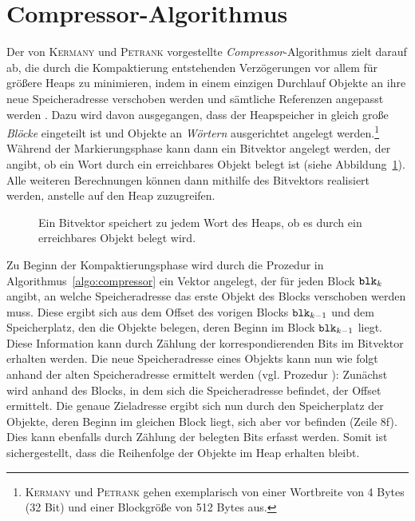 

\section{Compressor-Algorithmus}
\label{sec:compressor}

Der von \textsc{Kermany} und \textsc{Petrank} vorgestellte \textit{Compressor}-Algorithmus zielt darauf ab, die durch die Kompaktierung entstehenden Verzögerungen vor allem für größere Heaps zu minimieren, indem in einem einzigen Durchlauf Objekte an ihre neue Speicheradresse verschoben werden und sämtliche Referenzen angepasst werden \cite{kermany2006}.
Dazu wird davon ausgegangen, dass der Heapspeicher in gleich große \textit{Blöcke} eingeteilt ist und Objekte an \textit{Wörtern} ausgerichtet angelegt werden.\footnote{\textsc{Kermany} und \textsc{Petrank} gehen exemplarisch von einer Wortbreite von 4 Bytes (32 Bit) und einer Blockgröße von 512 Bytes aus.}
Während der Markierungsphase kann dann ein Bitvektor angelegt werden, der angibt, ob ein Wort durch ein erreichbares Objekt belegt ist (siehe Abbildung~\ref{fig:bitvector}).
Alle weiteren Berechnungen können dann mithilfe des Bitvektors realisiert werden, anstelle auf den Heap zuzugreifen.

\begin{figure}[h]
	\centering
	
	\caption[Bitvektor]{Ein Bitvektor speichert zu jedem Wort des Heaps, ob es durch ein erreichbares Objekt belegt wird.}
	\label{fig:bitvector}
\end{figure}

Zu Beginn der Kompaktierungsphase wird durch die Prozedur  in Algorithmus~\ref{algo:compressor} ein Vektor  angelegt, der für jeden Block $\texttt{blk}_k$ angibt, an welche Speicheradresse das erste Objekt des Blocks verschoben werden muss.
Diese ergibt sich aus dem Offset des vorigen Blocks $\texttt{blk}_{k-1}$ und dem Speicherplatz, den die Objekte belegen, deren Beginn im Block $\texttt{blk}_{k-1}$ liegt.
Diese Information kann durch Zählung der korrespondierenden Bits im Bitvektor erhalten werden.
Die neue Speicheradresse eines Objekts kann nun wie folgt anhand der alten Speicheradresse  ermittelt werden (vgl. Prozedur ):
Zunächst wird anhand des Blocks, in dem sich die Speicheradresse befindet, der Offset ermittelt.
Die genaue Zieladresse ergibt sich nun durch den Speicherplatz der Objekte, deren Beginn im gleichen Block liegt, sich aber vor  befinden (Zeile 8f).
Dies kann ebenfalls durch Zählung der belegten Bits erfasst werden.
Somit ist sichergestellt, dass die Reihenfolge der Objekte im Heap erhalten bleibt.

